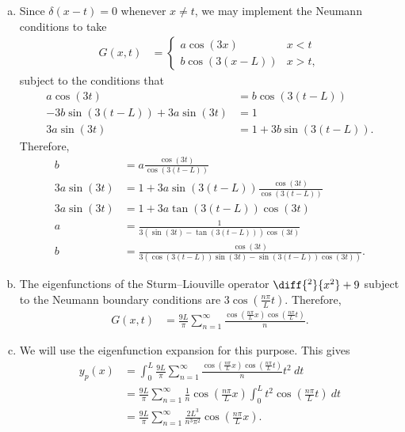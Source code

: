 \documentclass[10pt]{mypackage}
\begin{document}
\begin{solution}[42.11]\hfill
  \begin{enumerate}[(a)]
    \item Since $\delta\left( x-t \right) = 0$ whenever $x\neq t$, we may implement the Neumann conditions to take
      \begin{align*}
        G\left( x,t \right) &= \begin{cases}
          a\cos\left( 3x \right) & x < t\\
          b \cos\left( 3\left( x-L \right) \right) & x > t,
        \end{cases}
      \end{align*}
      subject to the conditions that
      \begin{align*}
        a\cos\left( 3t \right) &= b\cos\left( 3\left( t-L \right) \right)\\
        -3b\sin\left( 3\left( t-L \right) \right) + 3a\sin\left( 3t \right) &= 1\\
        3a\sin\left( 3t \right) &= 1 + 3b\sin\left( 3\left( t-L \right) \right).
      \end{align*}
      Therefore,
      \begin{align*}
        b &= a\frac{\cos\left( 3t \right)}{\cos\left( 3\left( t-L \right) \right)}\\
        3a\sin\left( 3t \right) &= 1 + 3a\sin\left( 3\left( t-L \right) \right)\frac{\cos\left( 3t \right)}{\cos\left( 3\left( t-L \right) \right)}\\
        3a\sin\left( 3t \right) &= 1 + 3a\tan\left( 3\left( t-L \right) \right)\cos\left( 3t \right)\\
        a &= \frac{1}{3\left( \sin\left( 3t \right) - \tan\left( 3\left( t-L \right) \right) \right)\cos\left( 3t \right)}\\
        b &= \frac{\cos\left( 3t \right)}{3\left( \cos\left( 3(t-L) \right)\sin\left( 3t \right) -\sin\left( 3\left( t-L \right) \right)\cos\left( 3t \right) \right)}.
      \end{align*}
    \item The eigenfunctions of the Sturm--Liouville operator $\diff{^2}{x^2} + 9$ subject to the Neumann boundary conditions are $3\cos\left( \frac{n\pi}{L}t \right)$. Therefore,
      \begin{align*}
        G(x,t) &= \frac{9L}{\pi}\sum_{n=1}^{\infty}\frac{\cos\left( \frac{n\pi}{L}x \right)\cos\left( \frac{n\pi}{L}t \right)}{n}.
      \end{align*}
    \item We will use the eigenfunction expansion for this purpose. This gives
      \begin{align*}
        y_p(x) &= \int_{0}^{L} \frac{9L}{\pi}\sum_{n=1}^{\infty}\frac{\cos\left( \frac{n\pi}{L}x \right)\cos\left( \frac{n\pi}{L}t \right)}{n} t^2\:dt\\
               &= \frac{9L}{\pi} \sum_{n=1}^{\infty} \frac{1}{n}\cos\left( \frac{n\pi}{L}x \right) \int_{0}^{L} t^2\cos\left( \frac{n\pi}{L}t \right)\:dt\\
               &= \frac{9L}{\pi} \sum_{n=1}^{\infty}\frac{2L^3}{n^3\pi^2}\cos\left( \frac{n\pi}{L}x \right).
      \end{align*}
      

\end{enumerate}
\end{solution}
\end{document}
